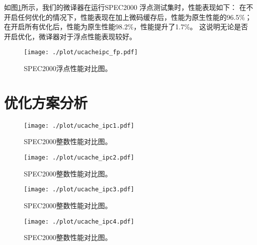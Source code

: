 如图\ref{img:ipc_fp}所示，我们的微译器在运行SPEC2000 浮点测试集时，性能表现如下：
在不开启任何优化的情况下，性能表现在加上微码缓存后，性能为原生性能的96.5\%；
在开启所有优化后，性能为原生性能98.2\%，性能提升了1.7\%。
这说明无论是否开启优化，微译器对于浮点性能表现较好。


\begin{figure}[!htbp]
  \centering
  \texttt{[image: ./plot/ucacheipc\_fp.pdf]}
  \caption{SPEC2000浮点性能对比图。}
  \label{img:ipc_fp}
\end{figure}


\section{优化方案分析}

\begin{figure}[!htbp]
  \centering
  \texttt{[image: ./plot/ucache\_ipc1.pdf]}
  \caption{SPEC2000整数性能对比图。}
  \label{img:ipc1}
\end{figure}

\begin{figure}[!htbp]
  \centering
  \texttt{[image: ./plot/ucache\_ipc2.pdf]}
  \caption{SPEC2000整数性能对比图。}
  \label{img:ipc2}
\end{figure}

\begin{figure}[!htbp]
  \centering
  \texttt{[image: ./plot/ucache\_ipc3.pdf]}
  \caption{SPEC2000整数性能对比图。}
  \label{img:ipc3}
\end{figure}

\begin{figure}[!htbp]
  \centering
  \texttt{[image: ./plot/ucache\_ipc4.pdf]}
  \caption{SPEC2000整数性能对比图。}
  \label{img:ipc4}
\end{figure}